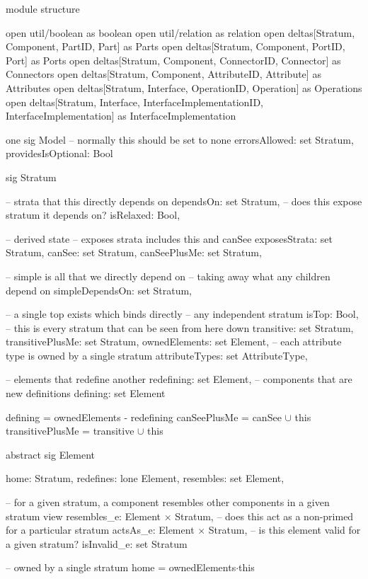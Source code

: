 module structure

open util/boolean as boolean
open util/relation as relation
open deltas[Stratum, Component, PartID, Part] as Parts
open deltas[Stratum, Component, PortID, Port] as Ports
open deltas[Stratum, Component, ConnectorID, Connector] as Connectors
open deltas[Stratum, Component, AttributeID, Attribute] as Attributes
open deltas[Stratum, Interface, OperationID, Operation] as Operations
open deltas[Stratum, Interface, InterfaceImplementationID, InterfaceImplementation] as InterfaceImplementation


one sig Model
{
  -- normally this should be set to none
  errorsAllowed: set Stratum,
  providesIsOptional: Bool
}

sig Stratum
{
  -- strata that this directly depends on
  dependsOn: set Stratum,
  -- does this expose stratum it depends on?
  isRelaxed: Bool,

  -- derived state -- exposes strata includes this and canSee
  exposesStrata: set Stratum,
  canSee: set Stratum,
  canSeePlusMe: set Stratum,

  -- simple is all that we directly depend on
  -- taking away what any children depend on
  simpleDependsOn: set Stratum,

  -- a single top exists which binds directly
  -- any independent stratum
  isTop: Bool,
  -- this is every stratum that can be seen from here down
  transitive: set Stratum,
  transitivePlusMe: set Stratum,
  ownedElements: set Element,
  -- each attribute type is owned by a single stratum
  attributeTypes: set AttributeType,

  -- elements that redefine another
  redefining: set Element,
  -- components that are new definitions
  defining: set Element
}
{
  defining = ownedElements - redefining
  canSeePlusMe = canSee $\cup$ this
  transitivePlusMe = transitive $\cup$ this
}

abstract sig Element
{
  home: Stratum,
  redefines: lone Element,
  resembles: set Element,

  -- for a given stratum, a component resembles other components in a given stratum view
  resembles_e: Element$\,\times\,$Stratum,
  -- does this act as a non-primed for a particular stratum
  actsAs_e: Element$\,\times\,$Stratum,
  -- is this element valid for a given stratum?
  isInvalid_e: set Stratum
}
{
  -- owned by a single stratum
  home = ownedElements$\cdot$this
}

